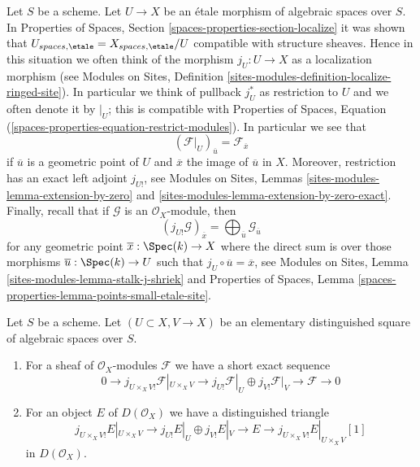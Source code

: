 \medskip\noindent
Let $S$ be a scheme. Let $U \to X$ be an \'etale morphism of algebraic
spaces over $S$. In
Properties of Spaces, Section \ref{spaces-properties-section-localize}
it was shown that
$U_{spaces, \etale} = X_{spaces, \etale}/U$
compatible with structure sheaves. Hence in this situation we
often think of the morphism $j_U : U \to X$ as a localization morphism
(see Modules on Sites, Definition
\ref{sites-modules-definition-localize-ringed-site}).
In particular we think of pullback $j_U^*$ as restriction to $U$
and we often denote it by ${}|_U$; this is compatible with
Properties of Spaces, Equation
(\ref{spaces-properties-equation-restrict-modules}).
In particular we see that
\begin{equation}
\label{equation-stalk-restriction}
(\mathcal{F}|_U)_{\overline{u}} = \mathcal{F}_{\overline{x}}
\end{equation}
if $\overline{u}$ is a geometric point of $U$ and $\overline{x}$
the image of $\overline{u}$ in $X$.
Moreover, restriction has an exact left adjoint $j_{U!}$, see
Modules on Sites, Lemmas \ref{sites-modules-lemma-extension-by-zero} and
\ref{sites-modules-lemma-extension-by-zero-exact}.
Finally, recall that if $\mathcal{G}$ is an $\mathcal{O}_X$-module,
then
\begin{equation}
\label{equation-stalk-j-shriek}
(j_{U!}\mathcal{G})_{\overline{x}} =
\bigoplus\nolimits_{\overline{u}} \mathcal{G}_{\overline{u}}
\end{equation}
for any geometric point $\overline{x} : \Spec(k) \to X$ where the
direct sum is over those morphisms $\overline{u} : \Spec(k) \to U$
such that $j_U \circ \overline{u} = \overline{x}$, see
Modules on Sites, Lemma \ref{sites-modules-lemma-stalk-j-shriek}
and
Properties of Spaces, Lemma
\ref{spaces-properties-lemma-points-small-etale-site}.

\begin{lemma}
\label{lemma-exact-sequence-lower-shriek}
Let $S$ be a scheme. Let $(U \subset X, V \to X)$ be an elementary
distinguished square of algebraic spaces over $S$.
\begin{enumerate}
\item For a sheaf of $\mathcal{O}_X$-modules $\mathcal{F}$
we have a short exact sequence
$$
0 \to j_{U \times_X V!}\mathcal{F}|_{U \times_X V} \to
j_{U!}\mathcal{F}|_U \oplus j_{V!}\mathcal{F}|_V \to \mathcal{F} \to 0
$$
\item For an object $E$ of $D(\mathcal{O}_X)$ we have a distinguished
triangle
$$
j_{U \times_X V!}E|_{U \times_X V} \to
j_{U!}E|_U \oplus j_{V!}E|_V \to E \to 
j_{U \times_X V!}E|_{U \times_X V}[1]
$$
in $D(\mathcal{O}_X)$.
\end{enumerate}
\end{lemma}

